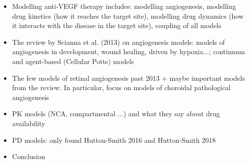 \documentclass[11pt,a4paper]{article}
\begin{document}
\newpage

\begin{itemize}
\item Modelling anti-VEGF therapy includes: modelling angiogenesis, modelling drug kinetics (how it reaches the target site), modelling drug dynamics (how it interacts with the disease in the target site), coupling of all models
\item The review by Scianna et al. (2013) on angiogenesis models: models of angiogenesis in development, wound healing, driven by hypoxia...; continuum and agent-based (Cellular Potts) models
\item The few models of retinal angiogenesis past 2013 + maybe important models from the review. In particular, focus on models of choroidal pathological angiogenesis 
\item PK models (NCA, compartmental ...) and what they say about drug availability
\item PD models: only found Hutton-Smith 2016 and Hutton-Smith 2018
\item Conclusion
\end{itemize}


{\normalsize }
\end{document}
